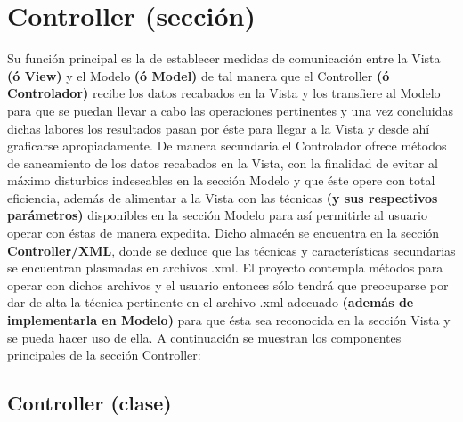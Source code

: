 \documentclass[class=report, crop=false]{standalone}
\begin{document}
\section{Controller (sección)}
\label{sec:a_4}
Su función principal es la de establecer medidas de comunicación entre 
la Vista \textbf{(ó View)} y el Modelo \textbf{(ó Model)} de tal manera 
que el Controller \textbf{(ó Controlador)} recibe los datos recabados en la Vista 
y los transfiere al Modelo para que se puedan llevar a cabo las operaciones pertinentes 
y una vez concluidas dichas labores los resultados pasan por éste para llegar a la 
Vista y desde ahí graficarse apropiadamente.\break
De manera secundaria el Controlador ofrece métodos de saneamiento de los datos 
recabados en la Vista, con la finalidad de evitar al máximo disturbios indeseables 
en la sección Modelo y que éste opere con total eficiencia, además de alimentar a la 
Vista con las técnicas \textbf{(y sus respectivos parámetros)} disponibles en la 
sección Modelo para así permitirle al usuario operar con éstas de manera expedita.\break
Dicho almacén se encuentra en la sección \textbf{Controller/XML}, donde se deduce 
que las técnicas y características secundarias se encuentran plasmadas en archivos 
.xml.\medskip\break
El proyecto contempla métodos para operar con dichos archivos y el usuario entonces 
sólo tendrá que preocuparse por dar de alta la técnica pertinente en el archivo .xml 
adecuado \textbf{(además de implementarla en Modelo)} para que ésta sea reconocida en 
la sección Vista y se pueda hacer uso de ella.\medskip\break
A continuación se muestran los componentes principales de la sección Controller:

\subsection{Controller (clase)}
\label{sec:a_4_1}
\end{document}
